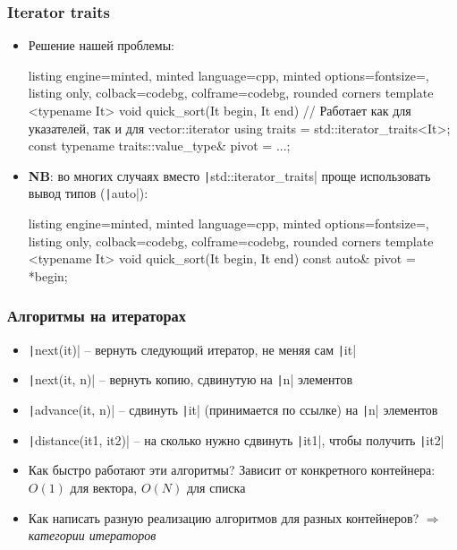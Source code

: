 \documentclass[10pt]{beamer}
\begin{document}
\begin{frame}[fragile]
\frametitle{Iterator traits}
\begin{itemize}
\item Решение нашей проблемы:
\begin{tcblisting}{listing engine=minted, minted language=cpp, minted options={fontsize=\scriptsize}, listing only, colback=codebg, colframe=codebg, rounded corners}
template <typename It>
void quick_sort(It begin, It end)
{
  // Работает как для указателей, так и для vector::iterator
  using traits = std::iterator_traits<It>;
  const typename traits::value_type& pivot = ...;
}
\end{tcblisting}
\pause
{}
\item \textbf{NB}: во многих случаях вместо \texttt|std::iterator_traits| проще использовать вывод типов (\texttt|auto|):
\begin{tcblisting}{listing engine=minted, minted language=cpp, minted options={fontsize=\scriptsize}, listing only, colback=codebg, colframe=codebg, rounded corners}
template <typename It>
void quick_sort(It begin, It end)
{
  const auto& pivot = *begin;
}
\end{tcblisting}
\end{itemize}
\end{frame}

\begin{frame}[fragile]
\frametitle{Алгоритмы на итераторах}
\begin{itemize}
\item \texttt|next(it)| -- вернуть следующий итератор, не меняя сам \texttt|it|
\pause
\item \texttt|next(it, n)| -- вернуть копию, сдвинутую на \texttt|n| элементов
\pause
\item \texttt|advance(it, n)| -- сдвинуть \texttt|it| (принимается по ссылке) на \texttt|n| элементов
\pause
\item \texttt|distance(it1, it2)| -- на сколько нужно сдвинуть \texttt|it1|, чтобы получить \texttt|it2|
\pause
\item Как быстро работают эти алгоритмы? \pause Зависит от конкретного контейнера: \(O(1)\) для вектора, \(O(N)\) для списка
\pause
\item Как написать разную реализацию алгоритмов для разных контейнеров? \pause \(\Longrightarrow\) \textit{категории итераторов}
\end{itemize}
\end{frame}
\end{document}

